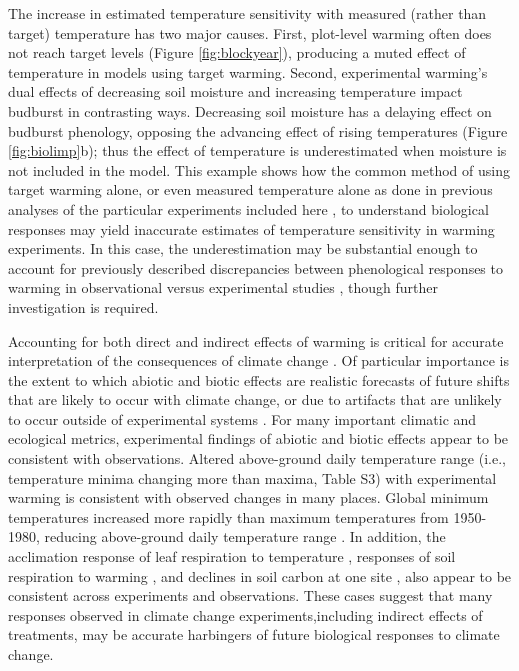 \documentclass{article}
\begin{document}
\par The increase in estimated temperature sensitivity with measured (rather than target) temperature has two major causes. First, plot-level warming often does not reach target levels (Figure \ref{fig:blockyear}), producing a muted effect of temperature in models using target warming. Second, experimental warming's dual effects of decreasing soil moisture and increasing temperature impact budburst in contrasting ways. 
Decreasing soil moisture has a delaying effect on budburst phenology, opposing the advancing effect of rising temperatures (Figure \ref{fig:biolimp}b); thus the effect of temperature is underestimated when moisture is not included in the model. This example shows how the common method of using target warming alone, or even measured temperature alone as done in previous analyses of the particular experiments included here \citep[exp01, exp03, exp04, exp10,][]{clark2014a,clark2014b,polgar2014,marchin2015}, to understand biological responses may yield inaccurate estimates of temperature sensitivity in warming experiments. In this case, the underestimation may be substantial enough to account for previously described discrepancies between phenological responses to warming in observational versus experimental studies \citep{wolkovich2012,polgar2014}, though further investigation is required. 

\par Accounting for both direct and indirect effects of warming is critical for accurate interpretation of the consequences of climate change \citep{kharouba2015}. Of particular importance is the extent to which abiotic and biotic effects are realistic forecasts of future shifts that are likely to occur with climate change, or due to artifacts that are unlikely to occur outside of experimental systems \citep{hurlbert1984,moise2010,diamond2013}. For many important climatic and ecological metrics, experimental findings of abiotic and biotic effects appear to be consistent with observations. Altered above-ground daily temperature range (i.e., temperature minima changing more than maxima, Table S3) with experimental warming is consistent with observed changes in many places. Global minimum temperatures increased more rapidly than maximum temperatures from 1950-1980, reducing above-ground daily temperature range \citep[][]{thorne2016,vose2005}. In addition, the acclimation response of leaf respiration to temperature \citep{aspinwall2016,reich2016}, responses of soil respiration to warming \citep{carey2016}, and declines in soil carbon at one site \citep{harte2015}, also appear to be consistent across experiments and observations. These cases suggest that many responses observed in climate change experiments,including indirect effects of treatments, may be accurate harbingers of future biological responses to climate change. 
\end{document}
